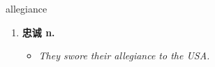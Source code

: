
\begin{frame}
{\huge allegiance}
\begin{center}
\begin{enumerate}\Large
  \item \textbf{忠诚 n.}
  \begin{itemize}
    \item \em{\Large{They swore their allegiance to the USA.}}
  \end{itemize}
\end{enumerate}
\end{center}
\end{frame}
